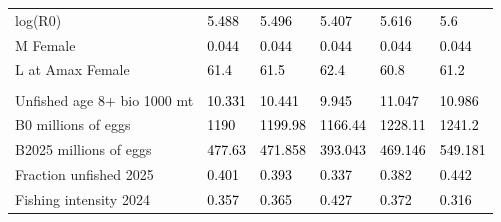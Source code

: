 \documentclass[
]{scrartcl}
\begin{document}
\begin{landscape}
\begin{longtable}[t]{ll>{\raggedright\arraybackslash}p{5em}>{\raggedright\arraybackslash}p{5em}>{\raggedright\arraybackslash}p{5em}>{\raggedright\arraybackslash}p{5em}}
\hspace{1em}log(R0) & \textcolor{black}{5.488} & \textcolor{black}{5.496} & \textcolor{black}{5.407} & \textcolor{black}{5.616} & \textcolor{black}{5.6}\\
\hspace{1em}M Female & \textcolor{black}{0.044} & \textcolor{black}{0.044} & \textcolor{black}{0.044} & \textcolor{black}{0.044} & \textcolor{black}{0.044}\\
\hspace{1em}L at Amax Female & \textcolor{black}{61.4} & \textcolor{black}{61.5} & \textcolor{black}{62.4} & \textcolor{black}{60.8} & \textcolor{black}{61.2}\\
\addlinespace[0.3em]
\multicolumn{6}{l}{\textbf{Estimates of derived quantities}}\\
\hspace{1em}Unfished age 8+ bio 1000 mt & \textcolor{black}{10.331} & \textcolor{black}{10.441} & \textcolor{black}{9.945} & \textcolor{black}{11.047} & \textcolor{black}{10.986}\\
\hspace{1em}B0 millions of eggs & \textcolor{black}{1190} & \textcolor{black}{1199.98} & \textcolor{black}{1166.44} & \textcolor{black}{1228.11} & \textcolor{black}{1241.2}\\
\hspace{1em}B2025 millions of eggs & \textcolor{black}{477.63} & \textcolor{black}{471.858} & \textcolor{black}{393.043} & \textcolor{black}{469.146} & \textcolor{black}{549.181}\\
\hspace{1em}Fraction unfished 2025 & \textcolor{black}{0.401} & \textcolor{black}{0.393} & \textcolor{black}{0.337} & \textcolor{black}{0.382} & \textcolor{black}{0.442}\\
\hspace{1em}Fishing intensity 2024 & \textcolor{black}{0.357} & \textcolor{black}{0.365} & \textcolor{black}{0.427} & \textcolor{black}{0.372} & \textcolor{black}{0.316}\\
\bottomrule

\end{longtable}

\endgroup{}


\end{landscape}

\newpage{}
\end{document}
